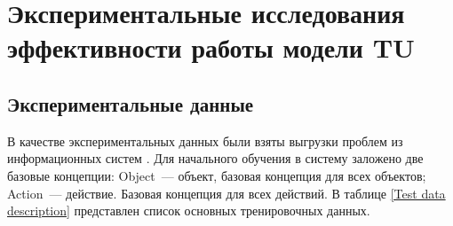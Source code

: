 \chapter{Экспериментальные исследования эффективности работы модели TU}


\section{Экспериментальные данные}
В качестве экспериментальных данных были взяты выгрузки проблем из информационных систем \icl. 
Для начального обучения в систему заложено две базовые концепции: Object~--- объект, базовая концепция для всех объектов; Action~--- действие. Базовая концепция для всех действий. 
В таблице \ref{Test data description} представлен список основных тренировочных данных.

